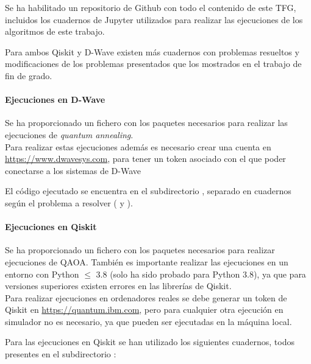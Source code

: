 Se ha habilitado un repositorio de Github\cite{codigo_tfg} con todo el contenido de este TFG, incluidos los cuadernos de Jupyter utilizados para realizar las ejecuciones de los algoritmos de este trabajo.

Para ambos Qiskit y D-Wave existen más cuadernos con problemas resueltos y modificaciones de los problemas presentados que los mostrados en el trabajo de fin de grado.

\paragraph{Ejecuciones en D-Wave}

Se ha proporcionado un fichero  con los paquetes necesarios para realizar las ejecuciones de \textit{quantum annealing}.
\\
Para realizar estas ejecuciones además es necesario crear una cuenta en \url{https://www.dwavesys.com}, para tener un token asociado con el que poder conectarse a los sistemas de D-Wave

El código ejecutado se encuentra en el subdirectorio , separado en cuadernos según el problema a resolver ( y ).

\paragraph{Ejecuciones en Qiskit}

Se ha proporcionado un fichero  con los paquetes necesarios para realizar ejecuciones de QAOA\@.
También es importante realizar las ejecuciones en un entorno con Python $\le$ 3.8 (solo ha sido probado para Python 3.8), ya que para versiones superiores existen errores en las librerías de Qiskit.
\\
Para realizar ejecuciones en ordenadores reales se debe generar un token de Qiskit en \url{https://quantum.ibm.com}, pero para cualquier otra ejecución en simulador no es necesario, ya que pueden ser ejecutadas en la máquina local.

Para las ejecuciones en Qiskit se han utilizado los siguientes cuadernos, todos presentes en el subdirectorio :

